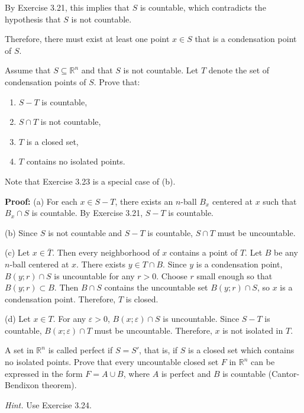 By Exercise 3.21, this implies that $S$ is countable, which contradicts the hypothesis that $S$ is not countable.

Therefore, there must exist at least one point $x \in S$ that is a condensation point of $S$.

\begin{problembox}
Assume that \( S \subseteq \mathbb{R}^n \) and that \( S \) is not countable. Let \( T \) denote the set of condensation points of \( S \). Prove that:
\begin{enumerate}[label=\alph*)]
\item \( S - T \) is countable,
\item \( S \cap T \) is not countable,
\item \( T \) is a closed set,
\item \( T \) contains no isolated points.
\end{enumerate}
Note that Exercise 3.23 is a special case of (b).
\end{problembox}

\textbf{Proof:} 
(a) For each $x \in S - T$, there exists an $n$-ball $B_x$ centered at $x$ such that $B_x \cap S$ is countable. By Exercise 3.21, $S - T$ is countable.

(b) Since $S$ is not countable and $S - T$ is countable, $S \cap T$ must be uncountable.

(c) Let $x \in \overline{T}$. Then every neighborhood of $x$ contains a point of $T$. Let $B$ be any $n$-ball centered at $x$. There exists $y \in T \cap B$. Since $y$ is a condensation point, $B(y;r) \cap S$ is uncountable for any $r > 0$. Choose $r$ small enough so that $B(y;r) \subset B$. Then $B \cap S$ contains the uncountable set $B(y;r) \cap S$, so $x$ is a condensation point. Therefore, $T$ is closed.

(d) Let $x \in T$. For any $\varepsilon > 0$, $B(x;\varepsilon) \cap S$ is uncountable. Since $S - T$ is countable, $B(x;\varepsilon) \cap T$ must be uncountable. Therefore, $x$ is not isolated in $T$.

\begin{problembox}
A set in \( \mathbb{R}^n \) is called perfect if \( S = S' \), that is, if \( S \) is a closed set which contains no isolated points. Prove that every uncountable closed set \( F \) in \( \mathbb{R}^n \) can be expressed in the form \( F = A \cup B \), where \( A \) is perfect and \( B \) is countable (Cantor-Bendixon theorem).

\textit{Hint.} Use Exercise 3.24.
\end{problembox}

